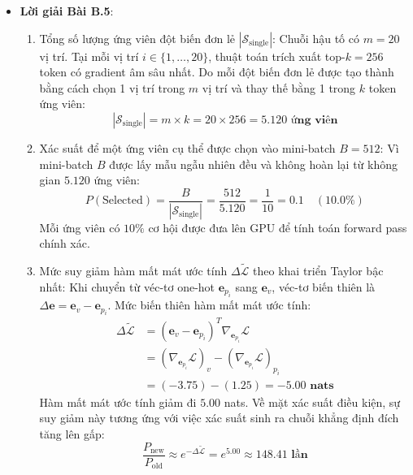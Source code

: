 \begin{itemize}
  \item \textbf{Lời giải Bài B.5}:
  \begin{enumerate}
    \item Tổng số lượng ứng viên đột biến đơn lẻ $|\mathcal{S}_{\text{single}}|$:
    Chuỗi hậu tố có $m = 20$ vị trí. Tại mỗi vị trí $i \in \{1, \dots, 20\}$, thuật toán trích xuất top-$k = 256$ token có gradient âm sâu nhất.
    Do mỗi đột biến đơn lẻ được tạo thành bằng cách chọn 1 vị trí trong $m$ vị trí và thay thế bằng 1 trong $k$ token ứng viên:
    \begin{equation*}
    |\mathcal{S}_{\text{single}}| = m \times k = 20 \times 256 = \mathbf{5.120 \text{ ứng viên}}
    \end{equation*}
    \item Xác suất để một ứng viên cụ thể được chọn vào mini-batch $B = 512$:
    Vì mini-batch $B$ được lấy mẫu ngẫu nhiên đều và không hoàn lại từ không gian $5.120$ ứng viên:
    \begin{equation*}
    P(\text{Selected}) = \frac{B}{|\mathcal{S}_{\text{single}}|} = \frac{512}{5.120} = \frac{1}{10} = \mathbf{0.1 \quad (10.0\%)}
    \end{equation*}
    Mỗi ứng viên có $10\%$ cơ hội được đưa lên GPU để tính toán forward pass chính xác.
    \item Mức suy giảm hàm mất mát ước tính $\Delta \tilde{\mathcal{L}}$ theo khai triển Taylor bậc nhất:
    Khi chuyển từ véc-tơ one-hot $\mathbf{e}_{p_i}$ sang $\mathbf{e}_v$, véc-tơ biến thiên là $\Delta \mathbf{e} = \mathbf{e}_v - \mathbf{e}_{p_i}$.
    Mức biến thiên hàm mất mát ước tính:
    \begin{align*}
    \Delta \tilde{\mathcal{L}} &= (\mathbf{e}_v - \mathbf{e}_{p_i})^T \nabla_{\mathbf{e}_{p_i}} \mathcal{L} \\
    &= (\nabla_{\mathbf{e}_{p_i}} \mathcal{L})_v - (\nabla_{\mathbf{e}_{p_i}} \mathcal{L})_{p_i} \\
    &= (-3.75) - (1.25) = \mathbf{-5.00 \text{ nats}}
    \end{align*}
    Hàm mất mát ước tính giảm đi $5.00$ nats. Về mặt xác suất điều kiện, sự suy giảm này tương ứng với việc xác suất sinh ra chuỗi khẳng định đích tăng lên gấp:
    \begin{equation*}
    \frac{P_{\text{new}}}{P_{\text{old}}} \approx e^{-\Delta \tilde{\mathcal{L}}} = e^{5.00} \approx \mathbf{148.41 \text{ lần}}
    \end{equation*}
  \end{enumerate}


\end{itemize}
